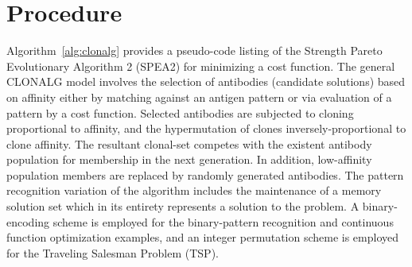 \documentclass[a4paper, 11pt]{article}
\begin{document}
\section{Procedure}
\label{sec:procedure}
Algorithm~\ref{alg:clonalg} provides a pseudo-code listing of the Strength Pareto Evolutionary Algorithm 2 (SPEA2) for minimizing a cost function. 
The general CLONALG model involves the selection of antibodies (candidate solutions) based on affinity either by matching against an antigen pattern or via evaluation of a pattern by a cost function. Selected antibodies are subjected to cloning proportional to affinity, and the hypermutation of clones inversely-proportional to clone affinity. The resultant clonal-set competes with the existent antibody population for membership in the next generation. In addition, low-affinity population members are replaced by randomly generated antibodies. The pattern recognition variation of the algorithm includes the maintenance of a memory solution set which in its entirety represents a solution to the problem. A binary-encoding scheme is employed for the binary-pattern recognition and continuous function optimization examples, and an integer permutation scheme is employed for the Traveling Salesman Problem (TSP).
\end{document}
